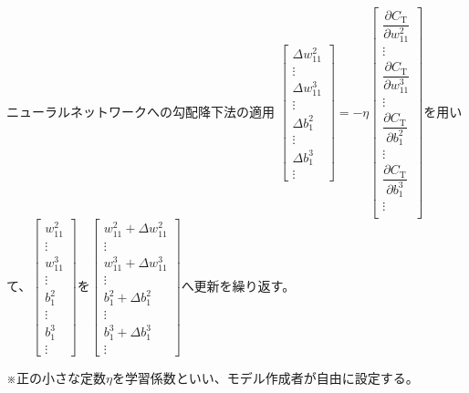 \documentclass[dvipdfmx,aspectratio=169]{beamer}
\begin{document}
	\begin{frame}{ニューラルネットワークへの勾配降下法の適用}
		$ \begin{bmatrix}
			\Delta w^2_{11}\\ \vdots\\
			\Delta w^3_{11}\\ \vdots\\
			\Delta b^2_1\\ \vdots\\
			\Delta b^3_1\\ \vdots
		\end{bmatrix} = -\eta \begin{bmatrix}
			\dfrac{\partial C_\mathrm{T}}{\partial w^2_{11}}\\ \vdots\\
			\dfrac{\partial C_\mathrm{T}}{\partial w^3_{11}}\\ \vdots\\
			\dfrac{\partial C_\mathrm{T}}{\partial b^2_1}\\ \vdots\\
			\dfrac{\partial C_\mathrm{T}}{\partial b^3_1}\\ \vdots\\
		\end{bmatrix} $を用いて、$ \begin{bmatrix}
			w^2_{11}\\ \vdots\\
			w^3_{11}\\ \vdots\\
			b^2_1\\ \vdots\\
			b^3_1\\ \vdots
		\end{bmatrix} $を$ \begin{bmatrix}
			w^2_{11} + \Delta w^2_{11}\\ \vdots\\
			w^3_{11} + \Delta w^3_{11}\\ \vdots\\
			b^2_1 + \Delta b^2_1\\ \vdots\\
			b^3_1 + \Delta b^3_1\\ \vdots
		\end{bmatrix} $へ更新を繰り返す。
		
		※正の小さな定数$ \eta $を\alert{学習係数}といい、モデル作成者が自由に設定する。
	\end{frame}
\end{document}
